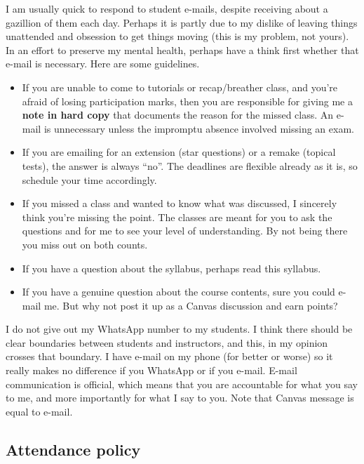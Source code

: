 \documentclass[
]{book}
\theoremstyle{definition}
\theoremstyle{definition}
\theoremstyle{definition}
\theoremstyle{definition}
\theoremstyle{remark}
\begin{document}
I am usually quick to respond to student e-mails, despite receiving about a gazillion of them each day. Perhaps it is partly due to my dislike of leaving things unattended and obsession to get things moving (this is my problem, not yours).
In an effort to preserve my mental health, perhaps have a think first whether that e-mail is necessary. Here are some guidelines.

\begin{itemize}
\item
  If you are unable to come to tutorials or recap/breather class, and you're afraid of losing participation marks, then you are responsible for giving me a \textbf{note in hard copy} that documents the reason for the missed class. An e-mail is unnecessary unless the impromptu absence involved missing an exam.
\item
  If you are emailing for an extension (star questions) or a remake (topical tests), the answer is always ``no''. The deadlines are flexible already as it is, so schedule your time accordingly.
\item
  If you missed a class and wanted to know what was discussed, I sincerely think you're missing the point. The classes are meant for you to ask the questions and for me to see your level of understanding. By not being there you miss out on both counts.
\item
  If you have a question about the syllabus, perhaps read this syllabus.
\item
  If you have a genuine question about the course contents, sure you could e-mail me. But why not post it up as a Canvas discussion and earn points?
\end{itemize}

I do not give out my WhatsApp number to my students. I think there should be clear boundaries between students and instructors, and this, in my opinion crosses that boundary. I have e-mail on my phone (for better or worse) so it really makes no difference if you WhatsApp or if you e-mail. E-mail communication is official, which means that you are accountable for what you say to me, and more importantly for what I say to you. Note that Canvas message is equal to e-mail.

\hypertarget{attendance-policy}{%
\subsection*{Attendance policy}\label{attendance-policy}}
\end{document}
